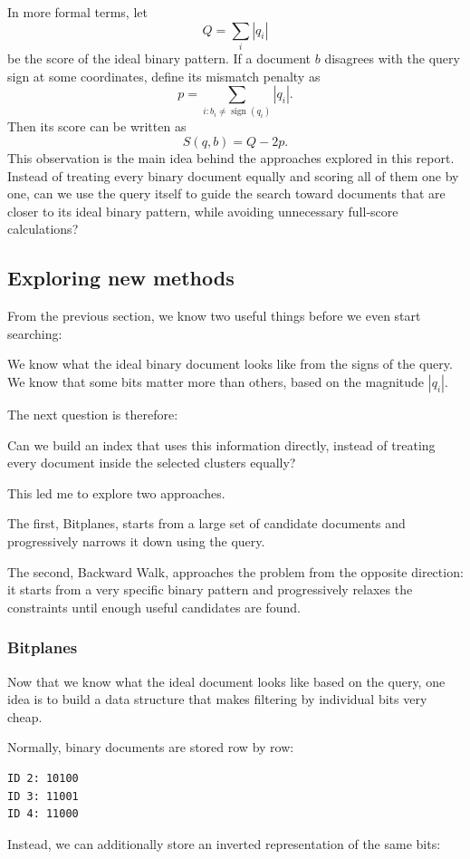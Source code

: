 In more formal terms, let
\[
Q=\sum_i|q_i|
\]
be the score of the ideal binary pattern. If a document $b$ disagrees with the query sign
at some coordinates, define its mismatch penalty as
\[
p=\sum_{i:b_i\ne\operatorname{sign}(q_i)}|q_i|.
\]
Then its score can be written as
\begin{equation}
S(q,b)=Q-2p.
\label{eq:score}
\end{equation}
This observation is the main idea behind the approaches explored in this report. Instead
of treating every binary document equally and scoring all of them one by one, can we use
the query itself to guide the search toward documents that are closer to its ideal binary
pattern, while avoiding unnecessary full-score calculations?

\subsection{Exploring new methods}
From the previous section, we know two useful things before we even start searching:

We know what the ideal binary document looks like from the signs of the query.
We know that some bits matter more than others, based on the magnitude $|q_i|$.

The next question is therefore:

Can we build an index that uses this information directly, instead of treating every
document inside the selected clusters equally?

This led me to explore two approaches.

The first, Bitplanes, starts from a large set of candidate documents and progressively
narrows it down using the query.

The second, Backward Walk, approaches the problem from the opposite direction: it starts
from a very specific binary pattern and progressively relaxes the constraints until enough
useful candidates are found.

\subsubsection{Bitplanes}
Now that we know what the ideal document looks like based on the query, one idea is to
build a data structure that makes filtering by individual bits very cheap.

Normally, binary documents are stored row by row:
\begin{verbatim}
ID 2: 10100
ID 3: 11001
ID 4: 11000
\end{verbatim}
Instead, we can additionally store an inverted representation of the same bits:

